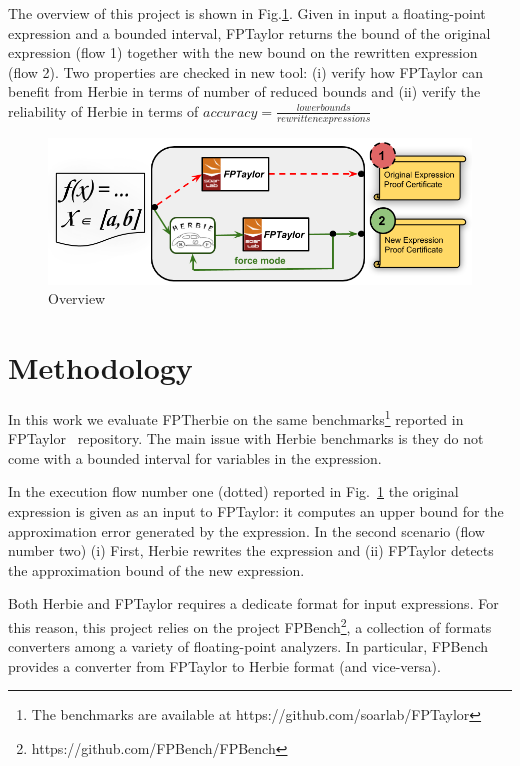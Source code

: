 \documentclass[runningheads]{llncs}
\begin{document}
The overview of this project is shown in Fig.\ref{fig:architecture}. Given in input a floating-point expression and a bounded interval, FPTaylor returns the bound of the original expression (flow 1) together with the new bound on the rewritten expression (flow 2). 
Two properties are checked in new tool: (i) verify how FPTaylor can benefit from Herbie in terms of number of reduced bounds and (ii) verify the reliability of Herbie in terms of $accuracy= \frac{lower bounds}{rewritten expressions}$
\begin{figure}[t]
	\begin{center}
		\includegraphics[width=\columnwidth]{picture}
	\end{center}
	\caption{Overview}\label{fig:architecture}
\end{figure}

\section{Methodology}
In this work we evaluate FPTherbie on the same benchmarks\footnote{The benchmarks are available at https://github.com/soarlab/FPTaylor} reported in FPTaylor~\cite{fptaylor} repository. The main issue with Herbie benchmarks is they do not come with a bounded interval for variables in the expression.

In the execution flow number one (dotted) reported in Fig.~\ref{fig:architecture} the original expression is given as an input to FPTaylor: it computes an upper bound for the approximation error generated by the expression.
In the second scenario (flow number two) (i) First, Herbie rewrites the expression and (ii) FPTaylor detects the approximation bound of the new expression.

Both Herbie and FPTaylor requires a dedicate format for input expressions. For this reason, this project relies on the project FPBench\footnote{https://github.com/FPBench/FPBench}, a collection of formats converters among a variety of floating-point analyzers. 
In particular, FPBench provides a converter from FPTaylor to Herbie format (and vice-versa).
\end{document}
